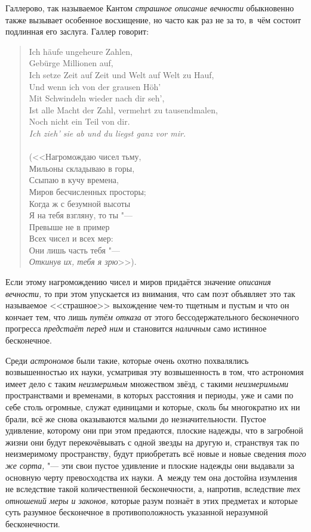 Галлерово, так называемое Кантом {\em страшное описание вечности} обыкновенно
также вызывает особенное восхищение, но часто как раз не за то, в~чём состоит
подлинная его заслуга. Галлер говорит:

\begin{verse}{\footnotesize
Ich häufe ungeheure Zahlen, \\
Gebürge Millionen auf, \\
Ich setze Zeit auf Zeit und Welt auf Welt zu Hauf, \\
Und wenn ich von der grausen Höh' \\
Mit Schwindeln wieder nach dir seh', \\
Ist alle Macht der Zahl, vermehrt zu tausendmalen, \\
Noch nicht ein Teil von dir. \\
{\em Ich zieh' sie ab und du liegst ganz vor mir.} \\
\ \\}
(<<Нагромождаю чисел тьму, \\
Мильоны складываю в горы, \\
Ссыпаю в кучу времена, \\
Миров бесчисленных просторы; \\
Когда ж с безумной высоты \\
Я на тебя взгляну, то ты "--- \\
Превыше не в пример \\
Всех чисел и всех мер: \\
Они лишь часть тебя "--- \\
{\em Откинув их, тебя я зрю}>>).
\end{verse}

Если этому нагромождению чисел и миров придаётся значение
{\em описания вечности,} то при этом упускается из внимания, что сам поэт
объявляет это так называемое <<страшное>> выхождение чем-то тщетным и пустым и
что он кончает тем, что лишь {\em путём отказа} от этого бессодержательного
бесконечного прогресса {\em предстаёт перед ним} и становится {\em наличным}
само истинное бесконечное.

Среди {\em астрономов} были такие, которые очень охотно похвалялись
возвышенностью их науки, усматривая эту возвышенность в том, что астрономия
имеет дело с таким {\em неизмеримым} множеством звёзд, с такими
{\em неизмеримыми} пространствами и временами, в которых расстояния и периоды,
уже и сами по себе столь огромные, служат единицами и которые, сколь бы
многократно их ни брали, всё же снова оказываются малыми до незначительности.
Пустое удивление, которому они при этом предаются, плоские надежды, что в
загробной жизни они будут перекочёвывать с одной звезды на другую и, странствуя
так по неизмеримому пространству, будут приобретать всё новые и новые сведения
{\em того же сорта,} "--- эти свои пустое удивление и плоские надежды они
выдавали за основную черту превосходства их науки. А~между тем она достойна
изумления не вследствие такой количественной бесконечности, а, напротив,
вследствие {\em тех отношений меры и законов,} которые разум познаёт в этих
предметах и которые суть разумное бесконечное в противоположность указанной
неразумной бесконечности.


